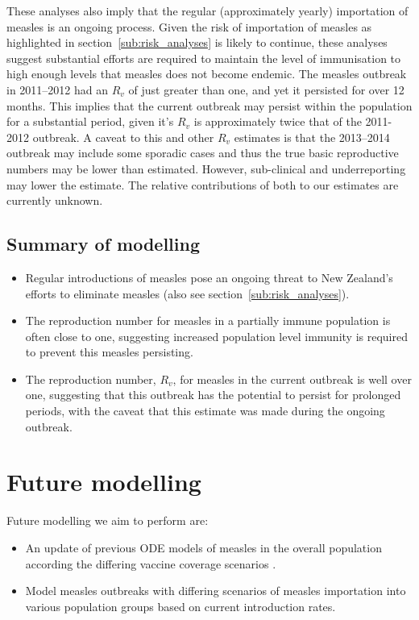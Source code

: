 \documentclass{article}
\begin{document}
{These analyses also imply that the regular (approximately yearly) importation of measles is an ongoing process. Given the risk of importation of measles as highlighted in section~\ref{sub:risk_analyses} is likely to continue, these analyses suggest substantial efforts are required to maintain the level of immunisation to high enough levels that measles does not become endemic. The measles outbreak in 2011--2012 had an $R_v$ of just greater than one, and yet it persisted for over 12 months. This implies that the current outbreak may persist within the population for a substantial period, given it's $R_v$ is approximately twice that of the 2011-2012 outbreak. A caveat to this and other $R_v$ estimates is that the 2013--2014 outbreak may include some sporadic cases and thus the true basic reproductive numbers may be lower than estimated. However, sub-clinical and underreporting may lower the estimate. The relative contributions of both to our estimates are currently unknown.

\subsection{Summary of modelling}
\begin{itemize}
\item Regular introductions of measles pose an ongoing threat to New Zealand's efforts to eliminate measles (also see section~\ref{sub:risk_analyses}).
\item The reproduction number for measles in a partially immune population is often close to one, suggesting increased population level immunity is required to prevent this measles persisting.
 \item The reproduction number, $R_v$, for measles in the current outbreak is well over one, suggesting that this outbreak has the potential to persist for prolonged periods, with the caveat that this estimate was made during the ongoing outbreak.
\end{itemize}

\section{Future modelling}
Future modelling we aim to perform are:
\begin{itemize}
\item An update of previous ODE models of measles in the overall population according the differing vaccine coverage scenarios \citep{roberts4}.
\item Model measles outbreaks with differing scenarios of measles importation into various population groups based on current introduction rates.
\end{itemize}

}
\end{document}
